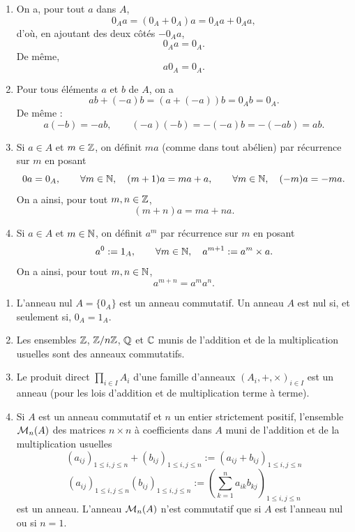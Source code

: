 \documentclass[]{report}
\begin{document}
\begin{re}{}{}
    \begin{enumerate}
        \item On a, pour tout $a$ dans $A$,
        \[0_A a = (0_A + 0_A) a = 0_A a + 0_A a,\]
        d'où, en ajoutant des deux côtés $-0_A a$,
        \[0_A a = 0_A.\]
        De même,
        \[a 0_A = 0_A.\]
        \item Pour tous éléments $a$ et $b$ de $A$, on a
        \[ab + (-a)b = (a + (-a))b = 0_A b = 0_A.\]
        De même :
        \[a(-b) = -ab, \qquad (-a)(-b) = -(-a)b = -(-ab) = ab.\]
        \item Si $a \in A$ et $m \in \mathbb{Z}$, on définit $ma$ (comme dans tout \gr abélien) par récurrence sur $m$ en posant
        \[0a = 0_A, \qquad \forall m \in \mathbb{N}, \quad (m+1)a = ma + a, \qquad \forall m \in \mathbb{N}, \quad (-m)a = -ma.\]
        On a ainsi, pour tout $m, n \in \mathbb{Z}$,
        \[(m+n)a = ma + na.\]
        \item Si $a \in A$ et $m \in \mathbb{N}$, on définit $a^m$ par récurrence sur $m$ en posant
        \[a^0 := 1_A, \qquad \forall m \in \mathbb{N}, \quad a^{m+1} := a^m \times a.\]
        On a ainsi, pour tout $m, n \in \mathbb{N}$,
        \[a^{m+n} = a^m a^n.\]
    \end{enumerate}
\end{re}

\begin{ex}{}{}
    \begin{enumerate}
        \item L'anneau nul $A = \{0_A\}$ est un anneau commutatif. Un anneau $A$ est nul si, et seulement si, $0_A = 1_A$.
        \item Les ensembles $\mathbb{Z}$, $\mathbb{Z}/n\mathbb{Z}$, $\mathbb{Q}$ et $\mathbb{C}$ munis de l'addition et de la multiplication usuelles sont des anneaux commutatifs.
        \item Le produit direct $\prod_{i \in I} A_i$ d'une famille d'anneaux $(A_i, +, \times)_{i \in I}$ est un anneau (pour les lois d'addition et de multiplication terme à terme).
        \item Si $A$ est un anneau commutatif et $n$ un entier strictement positif, l'ensemble $\mathcal{M}_n(A)$ des matrices $n \times n$ à coefficients dans $A$ muni de l'addition et de la multiplication usuelles
        \[(a_{ij})_{1 \le i,j \le n} + (b_{ij})_{1 \le i,j \le n} := (a_{ij} + b_{ij})_{1 \le i,j \le n}\]
        \[(a_{ij})_{1 \le i,j \le n} (b_{ij})_{1 \le i,j \le n} := \left( \sum_{k=1}^n a_{ik} b_{kj} \right)_{1 \le i,j \le n}\]
        est un anneau. L'anneau $\mathcal{M}_n(A)$ n'est commutatif que si $A$ est l'anneau nul ou si $n = 1$.
    \end{enumerate}
\end{ex}
\end{document}
